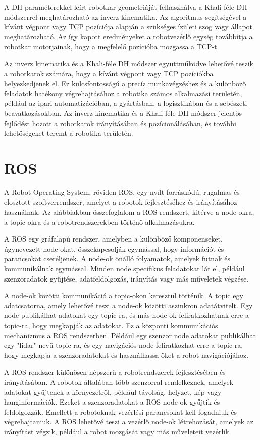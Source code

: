 A DH paraméterekkel leírt robotkar geometriáját felhasználva a Khali-féle DH módszerrel meghatározható az inverz kinematika. Az algoritmus segítségével a kívánt végpont vagy TCP pozíciója alapján a szükséges ízületi szög vagy állapot meghatározható. Az így kapott eredményeket a robotvezérlő egység továbbítja a robotkar motorjainak, hogy a megfelelő pozícióba mozgassa a TCP-t.

Az inverz kinematika és a Khali-féle DH módszer együttműködve lehetővé teszik a robotkarok számára, hogy a kívánt végpont vagy TCP pozíciókba helyezkedjenek el. Ez kulcsfontosságú a precíz munkavégzéshez és a különböző feladatok hatékony végrehajtásához a robotika számos alkalmazási területén, például az ipari automatizációban, a gyártásban, a logisztikában és a sebészeti beavatkozásokban. Az inverz kinematika és a Khali-féle DH módszer jelentős fejlődést hozott a robotkarok irányításában és pozícionálásában, és további lehetőségeket teremt a robotika területén.

\section{ROS}
A Robot Operating System, röviden ROS, egy nyílt forráskódú, rugalmas és elosztott szoftverrendszer, amelyet a robotok fejlesztéséhez és irányításához használnak. Az alábbiakban összefoglalom a ROS rendszert, kitérve a node-okra, a topic-okra és a robotrendszerekben történő alkalmazásukra.

A ROS egy gráfalapú rendszer, amelyben a különböző komponenseket, úgynevezett node-okat, összekapcsolják egymással, hogy információt és parancsokat cseréljenek. A node-ok önálló folyamatok, amelyek futnak és kommunikálnak egymással. Minden node specifikus feladatokat lát el, például szenzoradatok gyűjtése, adatfeldolgozás, irányítás vagy más műveletek végzése.

A node-ok közötti kommunikáció a topic-okon keresztül történik. A topic egy adatcsatorna, amely lehetővé teszi a node-ok közötti aszinkron adatátvitelt. Egy node publikálhat adatokat egy topic-ra, és más node-ok feliratkozhatnak erre a topic-ra, hogy megkapják az adatokat. Ez a központi kommunikációs mechanizmus a ROS rendszerben. Például egy szenzor node adatokat publikálhat egy "lidar" nevű topic-ra, és egy navigációs node feliratkozhat erre a topic-ra, hogy megkapja a szenzoradatokat és használhassa őket a robot navigációjához.

A ROS rendszer különösen népszerű a robotrendszerek fejlesztésében és irányításában. A robotok általában több szenzorral rendelkeznek, amelyek adatokat gyűjtenek a környezetről, például távolság, helyzet, kép vagy hanginformációk. Ezeket a szenzoradatokat a ROS node-ok gyűjtik és feldolgozzák. Emellett a robotoknak vezérlési parancsokat kell fogadniuk és végrehajtaniuk. A ROS lehetővé teszi a vezérlő node-ok létrehozását, amelyek az irányítást végzik, például a robot mozgását vagy más műveleteit vezérlik.

